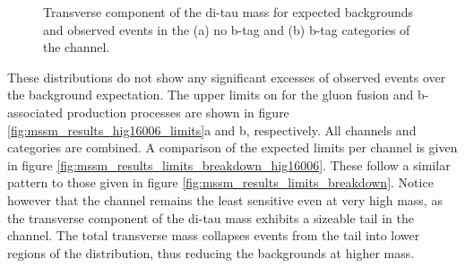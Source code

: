\begin{figure}[h!]
\begin{center}
\end{center}
\caption[Transverse component of the di-tau mass for expected backgrounds
and observed events in the no b-tag and b-tag cateogires of the \emu channel.]{Transverse component of the di-tau mass for expected backgrounds and
observed events in the (a) no b-tag and (b) b-tag categories of the \emu channel.}
\label{fig:mssm_hig16006_mtsv_em}
\end{figure}

These distributions do not show any significant excesses of observed events over
the background expectation. The upper limits
on \xsbr for the gluon fusion and b-associated production
processes are shown in figure \ref{fig:mssm_results_hig16006_limits}a
and b, respectively. All channels and categories are combined. A comparison of
the expected limits per channel is given in figure \ref{fig:mssm_results_limits_breakdown_hig16006}.
These follow a similar pattern to those given in figure \ref{fig:mssm_results_limits_breakdown}. Notice
however that the \emu channel remains the least sensitive even at very high mass, as the
transverse component of the di-tau mass exhibits a sizeable \ttbar tail in the \emu channel. The total
transverse mass collapses events from the tail into lower regions of the distribution, thus reducing the backgrounds
at higher mass.

